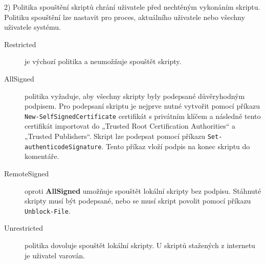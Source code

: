 \documentclass[12pt,a4paper]{article}
\begin{document}


2) 
Politika spouštění skriptů chrání uživatele před nechtěným vykonáním skriptu. Politiku spouštění lze nastavit pro proces, aktuálního uživatele nebo všechny uživatele systému.

\begin{description}

\item[Restricted] je výchozí politika a neumožňuje spouštět skripty.

\item[AllSigned] politika vyžaduje, aby všechny skripty byly podepsané důvěryhodným podpisem.
Pro podepsaní skriptu je nejprve nutné vytvořit pomocí příkazu \texttt{New-SelfSignedCertificate} certifikát s privátním klíčem a následně tento certifikát importovat do „Trusted Root Certification Authorities“ a „Trusted Publishers“. Skript lze podepsat pomocí příkazu  \texttt{Set-authenticodeSignature}. Tento příkaz vloží podpis na konec skriptu do komentáře.

\item[RemoteSigned] oproti \textbf{AllSigned} umožňuje spouštět lokální skripty bez podpisu. Stáhnuté skripty musí být podepsané, nebo se musí skript povolit pomocí příkazu \texttt{Unblock-File}.

\item[Unrestricted] politika dovoluje spouštět lokální skripty. U skriptů stažených z internetu je uživatel varován.

\end{description}
\end{document}
